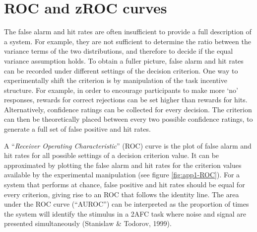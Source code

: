 \documentclass[12pt,twoside]{reedthesis}
\begin{document}
\hypertarget{app1-ROC}{%
\section{ROC and zROC curves}\label{app1-ROC}}

The false alarm and hit rates are often insufficient to provide a full description of a system. For example, they are not sufficient to determine the ratio between the variance terms of the two distributions, and therefore to decide if the equal variance assumption holds. To obtain a fuller picture, false alarm and hit rates can be recorded under different settings of the decision criterion. One way to experimentally shift the criterion is by manipulation of the task incentive structure. For example, in order to encourage participants to make more `no' responses, rewards for correct rejections can be set higher than rewards for hits. Alternatively, confidence ratings can be collected for every decision. The criterion can then be theoretically placed between every two possible confidence ratings, to generate a full set of false positive and hit rates.

A ``\emph{Receiver Operating Characteristic}'' (ROC) curve is the plot of false alarm and hit rates for all possible settings of a decision criterion value. It can be approximated by plotting the false alarm and hit rates for the criterion values available by the experimental manipulation (see figure \ref{fig:app1-ROC}). For a system that performs at chance, false positive and hit rates should be equal for every criterion, giving rise to an ROC that follows the identity line. The area under the ROC curve (``AUROC'') can be interpreted as the proportion of times the system will identify the stimulus in a 2AFC task where noise and signal are presented simultaneously (Stanislaw \& Todorov, 1999).
\end{document}

